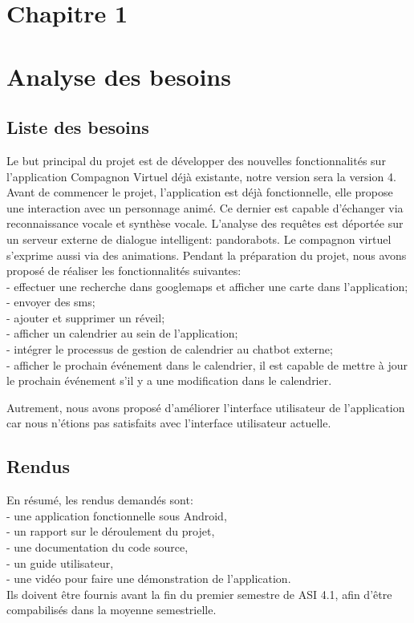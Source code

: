 \section*{Chapitre 1}
\section{Analyse des besoins}
\subsection{Liste des besoins}
Le but principal du projet est de développer des nouvelles fonctionnalités sur l'application Compagnon Virtuel déjà existante, notre version sera la version 4.
Avant de commencer le projet, l'application est déjà fonctionnelle, elle propose une interaction avec un personnage animé. Ce dernier est capable d'échanger via reconnaissance vocale et synthèse vocale. L'analyse des requêtes est déportée sur un serveur externe de dialogue intelligent: pandorabots. Le compagnon virtuel s'exprime aussi via des animations. Pendant la préparation du projet, nous avons proposé de réaliser les fonctionnalités suivantes:\\
	\indent- effectuer une recherche dans googlemaps et afficher une carte dans l'application;\\
	\indent- envoyer des sms;\\
	\indent- ajouter et supprimer un réveil;\\
	\indent- afficher un calendrier au sein de l'application;\\
	\indent- intégrer le processus de gestion de calendrier au chatbot externe;\\
	\indent- afficher le prochain événement dans le calendrier, il est capable de mettre à jour le prochain événement s'il y a une modification dans le calendrier.
	
Autrement, nous avons proposé d'améliorer l'interface utilisateur de l'application car nous n'étions pas satisfaits avec l'interface utilisateur actuelle.

\subsection{Rendus}
En résumé, les rendus demandés sont:\\
    \indent- une application fonctionnelle sous Android,\\
    \indent- un rapport sur le déroulement du projet,\\
    \indent- une documentation du code source,\\
    \indent- un guide utilisateur,\\
	\indent- une vidéo pour faire une démonstration de l'application.\\
\indent Ils doivent être fournis avant la fin du premier semestre de ASI 4.1, afin d'être compabilisés dans la moyenne semestrielle.
\newpage
